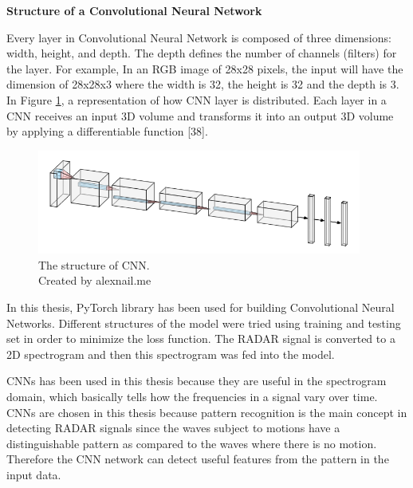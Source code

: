 \noindent \textbf{Structure of a Convolutional Neural Network}
\newline

\noindent Every layer in Convolutional Neural Network is composed of three dimensions: width, height, and depth. The depth defines the number of channels (filters) for the layer. For example, In an RGB image of 28x28 pixels,
the input will have the dimension of 28x28x3 where the width is 32, the height is 32 and the depth is 3.
In Figure \ref{fig:CNN}, a representation of how CNN layer is distributed. Each layer in a CNN
receives an input 3D volume and transforms it into an output 3D volume by applying a
differentiable function [38].
\begin{figure}[ht]
  \begin{center}
    \includegraphics[width=0.95\textwidth]{Master's thesis/images/cnn_structure.PNG} 
    \caption{The structure of CNN. \\
    Created by alexnail.me ~\cite{lenail}}
    \label{fig:CNN}
  \end{center}
\end{figure} 

In this thesis, PyTorch library has been used for building Convolutional Neural Networks. Different structures of the model were tried using training and testing set in order to minimize the loss function. 
The RADAR signal is converted to a 2D spectrogram and then this spectrogram was fed into the model.

CNNs has been used in this thesis because they are useful in the spectrogram domain, which basically tells how the frequencies in a signal vary over time. CNNs are chosen in this thesis because pattern recognition is the main concept in detecting RADAR signals since the waves subject to motions have a distinguishable pattern as compared to the waves where there is no motion. Therefore the CNN network can detect useful features from the pattern in the input data.






